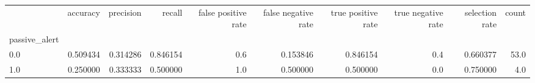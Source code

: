 \begin{tabular}{lrrrrrrrrr}
\toprule
{} &  accuracy &  precision &    recall &  false positive rate &  false negative rate &  true positive rate &  true negative rate &  selection rate &  count \\
passive\_alert &           &            &           &                      &                      &                     &                     &                 &        \\
\midrule
0.0           &  0.509434 &   0.314286 &  0.846154 &                  0.6 &             0.153846 &            0.846154 &                 0.4 &        0.660377 &   53.0 \\
1.0           &  0.250000 &   0.333333 &  0.500000 &                  1.0 &             0.500000 &            0.500000 &                 0.0 &        0.750000 &    4.0 \\
\bottomrule
\end{tabular}
